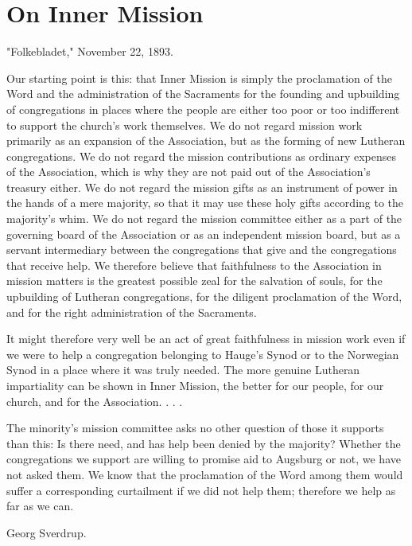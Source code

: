 
\section{On Inner Mission}

"Folkebladet," November 22, 1893.

Our starting point is this: that Inner Mission is simply the proclamation of the Word and the administration of the Sacraments for the founding and upbuilding of congregations in places where the people are either too poor or too indifferent to support the church’s work themselves. We do not regard mission work primarily as an expansion of the Association, but as the forming of new Lutheran congregations. We do not regard the mission contributions as ordinary expenses of the Association, which is why they are not paid out of the Association’s treasury either. We do not regard the mission gifts as an instrument of power in the hands of a mere majority, so that it may use these holy gifts according to the majority’s whim. We do not regard the mission committee either as a part of the governing board of the Association or as an independent mission board, but as a servant intermediary between the congregations that give and the congregations that receive help. We therefore believe that faithfulness to the Association in mission matters is the greatest possible zeal for the salvation of souls, for the upbuilding of Lutheran congregations, for the diligent proclamation of the Word, and for the right administration of the Sacraments.

It might therefore very well be an act of great faithfulness in mission work even if we were to help a congregation belonging to Hauge’s Synod or to the Norwegian Synod in a place where it was truly needed. The more genuine Lutheran impartiality can be shown in Inner Mission, the better for our people, for our church, and for the Association. . . .

The minority’s mission committee asks no other question of those it supports than this: Is there need, and has help been denied by the majority? Whether the congregations we support are willing to promise aid to Augsburg or not, we have not asked them. We know that the proclamation of the Word among them would suffer a corresponding curtailment if we did not help them; therefore we help as far as we can.

Georg Sverdrup.

